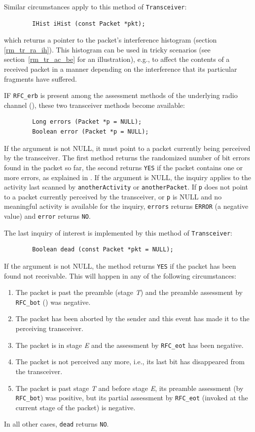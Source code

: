 Similar circumstances apply to this method of {\tt Transceiver}:
\begin{verbatim}
        IHist iHist (const Packet *pkt);
\end{verbatim}
\noindent
which returns a pointer to the packet's interference histogram 
(section \ref{rm_tr_ra_ih}).
This histogram can be used in tricky scenarios
(see section~\ref{rm_tr_ac_be} for an illustration),
e.g., to affect the contents of a received packet in a manner depending on the
interference that its particular fragments have suffered.

IF {\tt RFC\_erb} is present among the assessment methods of the underlying
radio channel (), these two transceiver methods
become available:
\begin{verbatim}
        Long errors (Packet *p = NULL);
        Boolean error (Packet *p = NULL);
\end{verbatim}
If the argument is not NULL, it must point to a packet currently being
perceived by the transceiver.
The first method returns the randomized number of bit errors found in the
packet so far, the second returns {\tt YES} if the packet contains one or more
errors, as explained in .
If the argument is NULL, the inquiry applies to the activity last scanned by
{\tt anotherActivity} or {\tt anotherPacket}.
If {\tt p} does not point to a packet currently perceived by the transceiver,
or {\tt p} is NULL and no meaningful activity is available for the inquiry,
{\tt errors} returns {\tt ERROR} (a negative value) and {\tt error} returns
{\tt NO}.

The last inquiry of interest is implemented by this method of
{\tt Transceiver}:
\begin{verbatim}
        Boolean dead (const Packet *pkt = NULL);
\end{verbatim}
\noindent
If the argument is not NULL, the method returns {\tt YES} if the packet has
been found not receivable.
This will happen in any of the following circumstances:
\begin{enumerate}
\item
The packet is past the preamble (stage {\em T\/}) and the preamble assessment
by {\tt RFC\_bot} () was negative.
\item
The packet has been aborted by the sender and this event has made it to
the perceiving transceiver.
\item
The packet is in stage {\em E\/} and the assessment by {\tt RFC\_eot} has
been negative.
\item
The packet is not perceived any more, i.e., its last bit has disappeared from
the transceiver.
\item
The packet is past stage {\em T\/} and before stage {\em E}, its preamble
assessment (by {\tt RFC\_bot}) was positive, but its partial assessment
by {\tt RFC\_eot} (invoked at the current stage of the packet) is negative.
\end{enumerate}
\noindent
In all other cases, {\tt dead} returns {\tt NO}.

